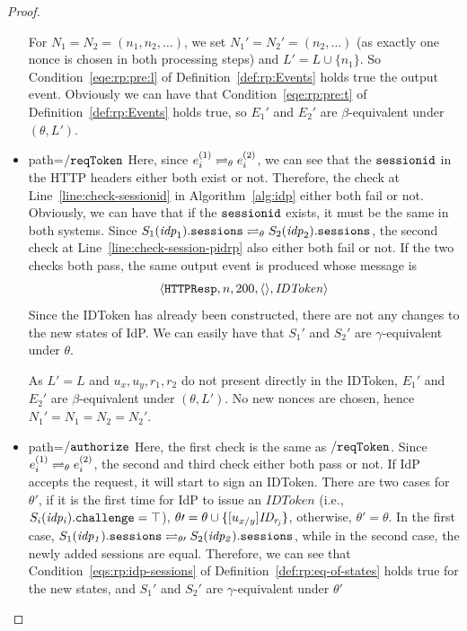 \begin{theorem}
\begin{proof}
\begin{itemize}
        For $N_1 = N_2 = (n_1, n_2, \dots)$, we set $N_1' = N_2' = (n_2, \dots)$ (as exactly one nonce is chosen in both processing steps) and $L' = L \cup \{n_1\}$. 
        So Condition~\ref{eqe:rp:pre:l} of Definition~\ref{def:rp:Events} holds true the output event.
        Obviously we can have that Condition~\ref{eqe:rp:pre:t} of Definition~\ref{def:rp:Events} holds true, so $E_1'$ and $E_2'$ are $\beta$-equivalent under $(\theta, L')$.
      \item path=$\mathtt{/reqToken}$ 
        Here, since $e_i^{(1)} \rightleftharpoons_{\theta} e_i^{(2)}$, 
        we can see that the $\mathtt{sessionid}$ in the HTTP headers either both exist or not.
        Therefore, the check at Line~\ref{line:check-sessionid} in Algorithm~\ref{alg:idp} either both fail or not. 
        Obviously, we can have that if the $\mathtt{sessionid}$ exists, it must be the same in both systems.
        Since $S_1(\mathit{idp}_1).\mathtt{sessions} \rightleftharpoons_{\theta} S_2(\mathit{idp}_2).\mathtt{sessions}$, 
        the second check at Line~\ref{line:check-session-pidrp} also either both fail or not.
        If the two checks both pass, the same output event is produced whose message is 
        \begin{align*}
          \langle {{}\mathtt{HTTPResp},n,200,\langle {{}} \rangle,\mathit{IDToken}} \rangle
        \end{align*}
        Since the IDToken has already been constructed, there are not any changes to the new states of IdP.
        We can easily have that $S_1\prime$ and $S_2\prime$ are $\gamma$-equivalent under $\theta$. 
        
        As $L' = L$ and $u_x, u_y, r_1, r_2$ do not present directly in the IDToken, $E_1'$ and $E_2'$ are $\beta$-equivalent under $(\theta, L')$.
        No new nonces are chosen, hence $N_1\prime=N_1=N_2=N_2\prime$.
      \item path=$\mathtt{/authorize}$ 
        Here, the first check is the same as $\mathtt{/reqToken}$.
        Since $e_i^{(1)} \rightleftharpoons_{\theta} e_i^{(2)}$, the second and third check either both pass or not.
        If IdP accepts the request, it will start to sign an IDToken.
        There are two cases for $\theta\prime$, if it is the first time for IdP to issue an $IDToken$ (i.e., $S_i(\mathit{idp_i}).\mathtt{challenge} = \top$), 
        $\theta\prime = \theta \cup \{ [u_{x/y}]\mathit{ID_{r_j}} \}$, otherwise, $\theta\prime = \theta$.
        In the first case, $S_1(\mathit{idp_1}).\mathtt{sessions} \rightleftharpoons_{\theta\prime} S_2(\mathit{idp_2}).\mathtt{sessions}$, 
        while in the second case, the newly added sessions are equal.
        Therefore, we can see that Condition~\ref{eqs:rp:idp-sessions} of Definition~\ref{def:rp:eq-of-states} holds true for the new states, 
        and $S_1\prime$ and $S_2\prime$ are $\gamma$-equivalent under $\theta\prime$


\end{itemize}
\end{proof}
\end{theorem}
